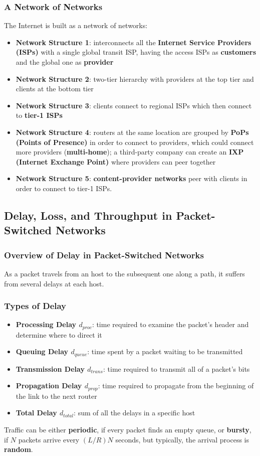 \documentclass{article}
\begin{document}
\subsubsection{A Network of Networks}
The Internet is built as a network of networks:
\begin{itemize}
    \item \textbf{Network Structure 1}: interconnects all the \textbf{Internet Service Providers (ISPs)} with a single global transit ISP, having the access ISPs as \textbf{customers} and the global one as \textbf{provider}
    \item \textbf{Network Structure 2}: two-tier hierarchy with providers at the top tier and clients at the bottom tier
    \item \textbf{Network Structure 3}: clients connect to regional ISPs which then connect to \textbf{tier-1 ISPs}
    \item \textbf{Network Structure 4}: routers at the same location are grouped by \textbf{PoPs (Points of Presence)} in order to connect to providers, which could connect more providers (\textbf{multi-home}); a third-party company can create an \textbf{IXP (Internet Exchange Point)} where providers can peer together
    \item \textbf{Network Structure 5}: \textbf{content-provider networks} peer with clients in order to connect to tier-1 ISPs.
\end{itemize}

\subsection{Delay, Loss, and Throughput in Packet-Switched Networks}
\subsubsection{Overview of Delay in Packet-Switched Networks}
As a packet travels from an host to the subsequent one along a path, it suffers from several delays at each host.
\newpage
\subsubsection*{Types of Delay}
\begin{itemize}
    \item \textbf{Processing Delay $ d_{proc} $}: time required to examine the packet’s header and determine where to direct it
    \item \textbf{Queuing Delay $ d_{queue} $}: time spent by a packet waiting to be transmitted
    \item \textbf{Transmission Delay $ d_{trans} $}: time required to transmit all of a packet's bits
    \item \textbf{Propagation Delay $ d_{prop} $}: time required to propagate from the beginning of the link to the next router
    \item \textbf{Total Delay $ d_{total} $}: sum of all the delays in a specific host
\end{itemize}
Traffic can be either \textbf{periodic}, if every packet finds an empty queue, or \textbf{bursty}, if $ N $ packets arrive every $ (L/R)N $ seconds, but typically, the arrival process is \textbf{random}.
\end{document}
